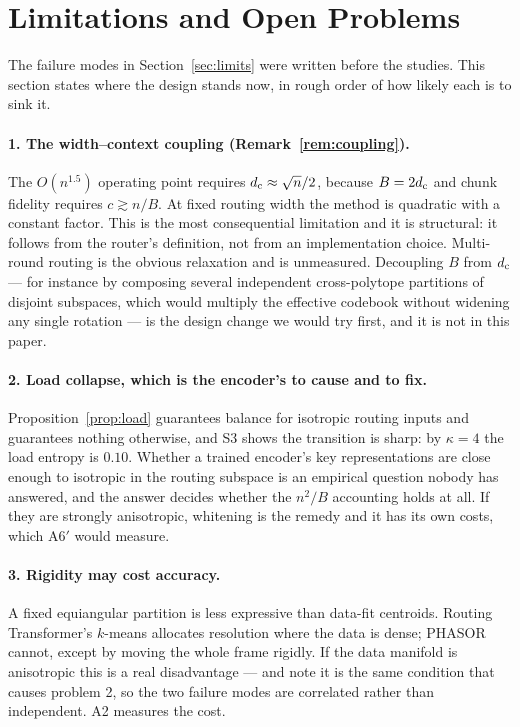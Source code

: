 \section{Limitations and Open Problems}
\label{sec:open}

The failure modes in Section~\ref{sec:limits} were written before the studies. This section states where the design stands now, in rough order of how likely each is to sink it.

\paragraph{1. The width--context coupling (Remark~\ref{rem:coupling}).} The $O(n^{1.5})$ operating point requires $d_{\mathrm{c}} \approx \sqrt{n}/2$, because $B = 2d_{\mathrm{c}}$ and chunk fidelity requires $c \gtrsim n/B$. At fixed routing width the method is quadratic with a constant factor. This is the most consequential limitation and it is structural: it follows from the router's definition, not from an implementation choice. Multi-round routing is the obvious relaxation and is unmeasured. Decoupling $B$ from $d_{\mathrm{c}}$ --- for instance by composing several independent cross-polytope partitions of disjoint subspaces, which would multiply the effective codebook without widening any single rotation --- is the design change we would try first, and it is not in this paper.

\paragraph{2. Load collapse, which is the encoder's to cause and to fix.} Proposition~\ref{prop:load} guarantees balance for isotropic routing inputs and guarantees nothing otherwise, and S3 shows the transition is sharp: by $\kappa = 4$ the load entropy is $0.10$. Whether a trained encoder's key representations are close enough to isotropic in the routing subspace is an empirical question nobody has answered, and the answer decides whether the $n^2/B$ accounting holds at all. If they are strongly anisotropic, whitening is the remedy and it has its own costs, which A6$'$ would measure.

\paragraph{3. Rigidity may cost accuracy.} A fixed equiangular partition is less expressive than data-fit centroids. Routing Transformer's $k$-means allocates resolution where the data is dense; PHASOR cannot, except by moving the whole frame rigidly. If the data manifold is anisotropic this is a real disadvantage --- and note it is the same condition that causes problem 2, so the two failure modes are correlated rather than independent. A2 measures the cost.

